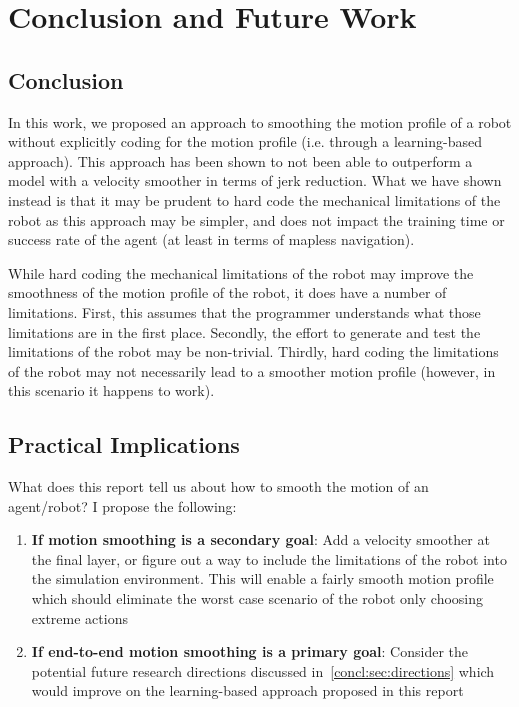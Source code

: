 \chapter{Conclusion and Future Work}
\label{ch:concl}

\section{Conclusion}

In this work, we proposed an approach to smoothing the motion profile of a robot without explicitly coding for the motion profile (i.e. through a learning-based approach). This approach has been shown to not been able to outperform a model with a velocity smoother in terms of jerk reduction. What we have shown instead is that it may be prudent to hard code the mechanical limitations of the robot as this approach may be simpler, and does not impact the training time or success rate of the agent (at least in terms of mapless navigation).

While hard coding the mechanical limitations of the robot may improve the smoothness of the motion profile of the robot, it does have a number of limitations. First, this assumes that the programmer understands what those limitations are in the first place. Secondly, the effort to generate and test the limitations of the robot may be non-trivial. Thirdly, hard coding the limitations of the robot may not necessarily lead to a smoother motion profile (however, in this scenario it happens to work).

\section{Practical Implications}
What does this report tell us about how to smooth the motion of an agent/robot? I propose the following:
\begin{enumerate}
\item \textbf{If motion smoothing is a secondary goal}: Add a velocity smoother at the final layer, or figure out a way to include the limitations of the robot into the simulation environment. This will enable a fairly smooth motion profile which should eliminate the worst case scenario of the robot only choosing extreme actions
\item \textbf{If end-to-end motion smoothing is a primary goal}: Consider the potential future research directions discussed in~\autoref{concl:sec:directions} which would improve on the learning-based approach proposed in this report
\end{enumerate}

